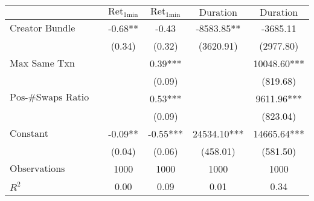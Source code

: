 \begin{tabular}{lcccc}
\hline
 & $\text{Ret}_{\text{1min}}$ & $\text{Ret}_{\text{1min}}$ & $\text{Duration}$ & $\text{Duration}$ \\
\hline
$\text{Creator Bundle Launch}$ & -0.68** & -0.43 & -8583.85** & -3685.11 \\
 & (0.34) & (0.32) & (3620.91) & (2977.80) \\
$\text{Max Same Txn}$ &  & 0.39*** &  & 10048.60*** \\
 &  & (0.09) &  & (819.68) \\
$\text{Pos-\#Swaps Ratio}$ &  & 0.53*** &  & 9611.96*** \\
 &  & (0.09) &  & (823.04) \\
$\text{Constant}$ & -0.09** & -0.55*** & 24534.10*** & 14665.64*** \\
 & (0.04) & (0.06) & (458.01) & (581.50) \\
$\text{Observations}$ & 1000 & 1000 & 1000 & 1000 \\
$R^2$ & 0.00 & 0.09 & 0.01 & 0.34 \\
\hline
\end{tabular}